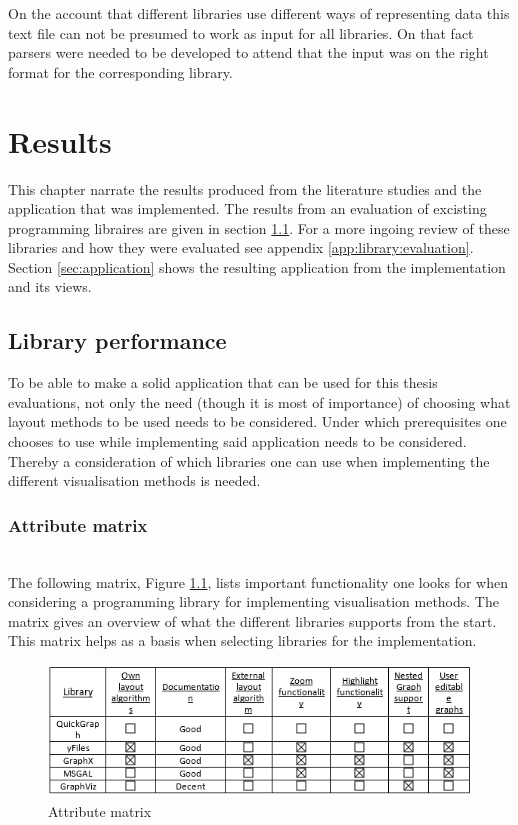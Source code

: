 \documentclass[a4paper,11pt]{kth-mag}
\begin{document}
On the account that different libraries use different ways of representing data this text file can not be presumed to work as input for all libraries. On that fact parsers were needed to be developed to
attend that the input was on the right format for the corresponding library.
\chapter{Results}
\label{chap:results}
This chapter narrate the results produced from the literature studies and the application that was implemented. The results from an evaluation of excisting programming
libraires are given in section \ref{sec:libperform}. For a more ingoing review of these libraries and how they were evaluated see appendix \ref{app:library:evaluation}. 
Section \ref{sec:application} shows the resulting application from the implementation and its views.  
\section{Library performance}
\label{sec:libperform}
To be able to make a solid application that can be used for this thesis evaluations, not only the need (though it is most of importance) of choosing what layout methods to be used needs to be considered. Under which prerequisites
one chooses to use while implementing said application needs to be considered. Thereby a consideration of which libraries one can use when implementing the different visualisation methods is needed.
\subsection{Attribute matrix}
\label{Lib:attribute}
\newline
\\
The following matrix, Figure \ref{fig:AttributeMatrix}, lists important functionality one looks for when considering a programming library for implementing visualisation methods. The matrix gives an overview of what the 
different libraries supports from the start. This matrix helps as a basis when selecting libraries for the implementation.\\

\begin{figure}[!htbp]
	\centering
	\includegraphics[scale=1.0]{LibraryAttributeMatrix}
	\caption{Attribute matrix}
	\label{fig:AttributeMatrix}
\end{figure}
\end{document}
